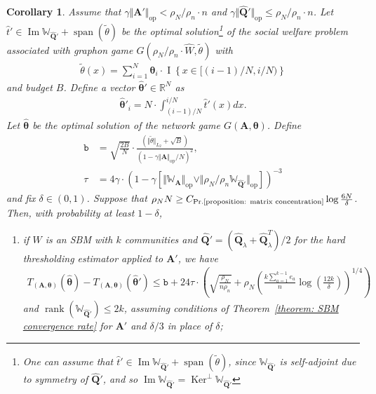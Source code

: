 \documentclass[11pt]{article}
\newcommand{\bbR}{\mathbb{R}}
\newcommand{\op}{\mathrm{op}}
\newcommand{\bA}{\bm{A}}
\newcommand{\bQ}{\bm{Q}}
\newcommand{\btheta}{\bm{\theta}}
\newcommand{\bbW}{\mathbb{W}}
\newcommand{\indicator}[1]{{\operatorname{I} \left \{ #1\right \}}}
\newcommand{\constantBandeira}{C_{\text{Pr.\ref{proposition: matrix concentration}}}}
\newcommand{\<}{\langle}
\renewcommand{\>}{\rangle}
\newcommand{\ttb}{\mathtt{b}}
\DeclareMathOperator{\rank}{rank}
\theoremstyle{plain}
\newtheorem{corollary}{Corollary}
\theoremstyle{definition}
\theoremstyle{remark}
\begin{document}
\begin{corollary}
    Assume that $\gamma \Vert \bA' \Vert_{\op} < \rho_N / \rho_n \cdot n$ and $\gamma \Vert \widehat{\bQ}' \Vert_{\op} \le \rho_N / \rho_n \cdot n$.
    Let $\hat{t}' \in \operatorname{Im} \bbW_{\widehat{\bQ}'} + \operatorname{span}(\tilde{\theta})$ be the optimal solution\footnote{One can assume that $\hat{t}' \in \operatorname{Im} \bbW_{\widehat{\bQ}'} + \operatorname{span}(\tilde{\theta})$, since $\bbW_{\widehat{\bQ}'}$ is self-adjoint due to symmetry of $\widehat{\bQ}'$, and so $\operatorname{Im} \bbW_{\widehat{\bQ}'} = \operatorname{Ker}^{\perp} \bbW_{\widehat{\bQ}'}$} of the social welfare problem associated with graphon game $G(\rho_N / \rho_n \cdot \widehat{W},\tilde \theta)$ with
    \begin{align*}
        \tilde \theta(x) = \sum_{i = 1}^N \btheta_i \cdot \indicator{x \in [(i-1)/N, i/N)}
    \end{align*}
    and budget $B$.
    Define a vector $\widehat{\btheta}' \in \bbR^N$ as
    \begin{align*} 
        \widehat{\btheta}'_i = N \cdot \int_{(i - 1)/N}^{i/N} \hat{t}'(x) dx.
    \end{align*}
    Let $\widehat{\btheta}$ be the optimal solution of the network game $G(\bA,\btheta)$. Define 
    \begin{align*}
        \ttb & = \sqrt{\frac{2B}{N}} \cdot \frac{(\Vert \tilde{\theta} \Vert_{L_2} + \sqrt{B})}{(1 - \gamma \Vert \bA \Vert_{\op} / N)^2},\\
        \tau & = 4 \gamma \cdot (1 - \gamma [\Vert \bbW_{\bA} \Vert_{\op} \vee \Vert \rho_N / \rho_n \bbW_{\widehat{\bQ}'} \Vert_{\op}])^{-3} 
    \end{align*}
    and fix $\delta \in (0, 1)$. Suppose that $\rho_N N \ge \constantBandeira \log \frac{6 N }{\delta}$. Then, with probability at least $1 - \delta$, 
    \begin{enumerate}
        \item if $W$ is an SBM with $k$ communities and $\widehat{\bQ}' = (\widehat{\bQ}_{\lambda} + \widehat{\bQ}_\lambda^T)/2$ for the hard thresholding estimator applied to $\bA'$, we have
        \begin{align*}
             T_{(\bA, \btheta)}(\hat{\btheta}) - T_{(\bA, \btheta)}(\hat{\btheta}') \le \ttb + 24\tau \cdot \left (\sqrt{\frac{\rho_N}{n \rho_n}}+  \rho_N \left ( \frac{k \sum_{a = 1}^{k - 1}e_a}{n} \log \left ( \frac{12k}{\delta} \right) \right )^{1/4} \right )
        \end{align*}
        and $\rank(\bbW_{\widehat{\bQ}'}) \le 2k$, assuming conditions of Theorem~\ref{theorem: SBM convergence rate} for $\bA'$ and $\delta/3$ in place of $\delta$;

\end{enumerate}
\end{corollary}
\end{document}
